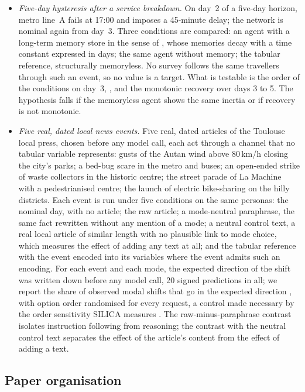 \begin{itemize}
  \item \emph{Five-day hysteresis after a service breakdown.} On day~2 of a five-day horizon, metro line~A fails at 17:00 and imposes a 45-minute delay; the network is nominal again from day~3.
  Three conditions are compared: an agent with a long-term memory store in the sense of \citet{park2023generative}, whose memories decay with a time constant expressed in days; the same agent without memory; the tabular reference, structurally memoryless. No survey follows the same travellers through such an event, so no value is a target. What is testable is the order of the conditions on day~3, , and the monotonic recovery over days 3 to 5. The hypothesis falls if the memoryless agent shows the same inertia or if recovery is not monotonic.
  \item \emph{Five real, dated local news events.} Five real, dated articles of the Toulouse local press, chosen before any model call, each act through a channel that no tabular variable represents:
  gusts of the Autan wind above 80\,km/h closing the city's parks; a bed-bug scare in the metro and buses; an open-ended strike of waste collectors in the historic centre; the street parade of La Machine with a pedestrianised centre; the launch of electric bike-sharing on the hilly districts. Each event is run under five conditions on the same personas: the nominal day, with no article; the raw article; a mode-neutral paraphrase, the same fact rewritten without any mention of a mode; a neutral control text, a real local article of similar length with no plausible link to mode choice, which measures the effect of adding any text at all; and the tabular reference with the event encoded into its variables where the event admits such an encoding. For each event and each mode, the expected direction of the shift was written down before any model call, 20 signed predictions in all; we report the share of observed modal shifts that go in the expected direction , with option order randomised for every request, a control made necessary by the order sensitivity SILICA measures \citep{bintareaf2026silica}. The raw-minus-paraphrase contrast isolates instruction following from reasoning; the contrast with the neutral control text separates the effect of the article's content from the effect of adding a text.
\end{itemize}

\subsection{Paper organisation}

